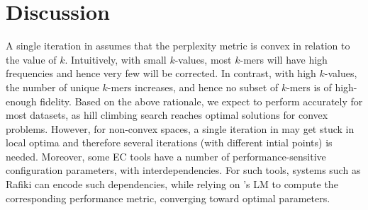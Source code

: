 \vspace{-12pt}
\section{Discussion}
\vspace{-5pt}
A single iteration in \name assumes that the perplexity metric is convex in relation to the value of $k$. Intuitively, with small $k$-values, most $k$-mers will have high frequencies and hence very few will be corrected. In contrast, with high $k$-values, the number of unique $k$-mers increases, and hence no subset of $k$-mers is of high-enough fidelity. Based on the above rationale, we expect \name to perform accurately for most datasets, as hill climbing search reaches optimal solutions for convex problems. However, for non-convex spaces, a single iteration in \name may get stuck in local optima and therefore several iterations (with different intial points) is needed.  Moreover, some EC tools have a number of performance-sensitive configuration parameters, with interdependencies. For such tools, systems such as Rafiki \cite{mahgoub2017rafiki} can encode such dependencies, while relying on \name's LM to compute the corresponding performance metric, converging toward optimal parameters.

